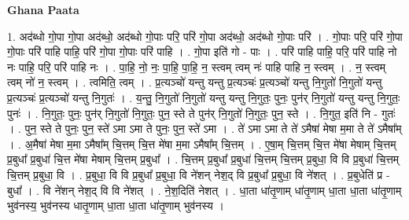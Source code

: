\documentclass[17pt]{extarticle}
\begin{document}
\textbf{Ghana Paata } \newline

1. अद॑ब्धो गो॒पा गो॒पा अद॑ब्धो॒ अद॑ब्धो गो॒पाः परि॒ परि॑ गो॒पा अद॑ब्धो॒ अद॑ब्धो गो॒पाः परि॑ । . गो॒पाः परि॒ परि॑ गो॒पा गो॒पाः परि॑ पाहि पाहि॒ परि॑ गो॒पा गो॒पाः परि॑ पाहि । . गो॒पा इति॑ गो - पाः । . परि॑ पाहि पाहि॒ परि॒ परि॑ पाहि नो नः पाहि॒ परि॒ परि॑ पाहि नः । . पा॒हि॒ नो॒ नः॒ पा॒हि॒ पा॒हि॒ न॒ स्त्वम् त्वम् नः॑ पाहि पाहि न॒ स्त्वम् । . न॒ स्त्वम् त्वम् नो॑ न॒ स्त्वम् । . त्वमिति॒ त्वम् । . प्र॒त्यञ्चो॑ यन्तु यन्तु प्र॒त्यञ्चः॑ प्र॒त्यञ्चो॑ यन्तु नि॒गुतो॑ नि॒गुतो॑ यन्तु प्र॒त्यञ्चः॑ प्र॒त्यञ्चो॑ यन्तु नि॒गुतः॑ । . य॒न्तु॒ नि॒गुतो॑ नि॒गुतो॑ यन्तु यन्तु नि॒गुतः॒ पुनः॒ पुन॑र् नि॒गुतो॑ यन्तु यन्तु नि॒गुतः॒ पुनः॑ । . नि॒गुतः॒ पुनः॒ पुन॑र् नि॒गुतो॑ नि॒गुतः॒ पुन॒ स्ते ते पुन॑र् नि॒गुतो॑ नि॒गुतः॒ पुन॒ स्ते । . नि॒गुत॒ इति॑ नि - गुतः॑ । . पुन॒ स्ते ते पुनः॒ पुन॒ स्ते॑ ऽमा ऽमा ते पुनः॒ पुन॒ स्ते॑ ऽमा । . ते॑ ऽमा ऽमा ते ते॑ ऽमैषा॑ मेषा म॒मा ते ते॑ ऽमैषा᳚म् । . अ॒मैषा॑ मेषा म॒मा ऽमैषा᳚म् चि॒त्तम् चि॒त्त मे॑षा म॒मा ऽमैषा᳚म् चि॒त्तम् । . ए॒षा॒म् चि॒त्तम् चि॒त्त मे॑षा मेषाम् चि॒त्तम् प्र॒बुधा᳚ प्र॒बुधा॑ चि॒त्त मे॑षा मेषाम् चि॒त्तम् प्र॒बुधा᳚ । . चि॒त्तम् प्र॒बुधा᳚ प्र॒बुधा॑ चि॒त्तम् चि॒त्तम् प्र॒बुधा॒ वि वि प्र॒बुधा॑ चि॒त्तम् चि॒त्तम् प्र॒बुधा॒ वि । . प्र॒बुधा॒ वि वि प्र॒बुधा᳚ प्र॒बुधा॒ वि ने॑शन् नेश॒द् वि प्र॒बुधा᳚ प्र॒बुधा॒ वि ने॑शत् । . प्र॒बुधेति॑ प्र - बुधा᳚ । . वि ने॑शन् नेश॒द् वि वि ने॑शत् । . ने॒श॒दिति॑ नेशत् । . धा॒ता धा॑तृ॒णाम् धा॑तृ॒णाम् धा॒ता धा॒ता धा॑तृ॒णाम् भुव॑नस्य॒ भुव॑नस्य धातृ॒णाम् धा॒ता धा॒ता धा॑तृ॒णाम् भुव॑नस्य । \newline
\end{document}
